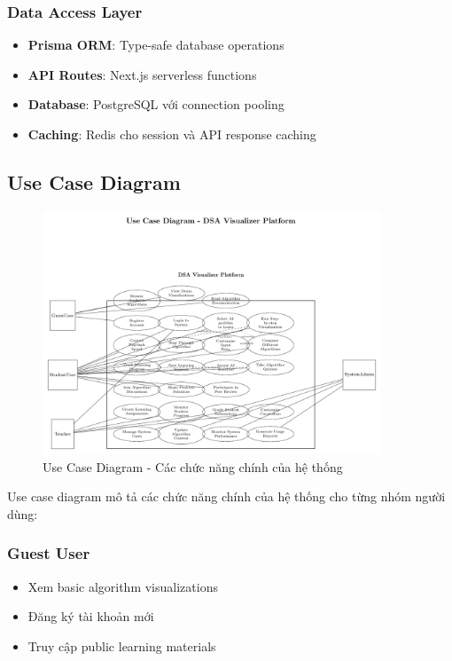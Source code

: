 \documentclass[12pt,a4paper]{article}
\begin{document}
\subsubsection{Data Access Layer}
\begin{itemize}
    \item \textbf{Prisma ORM}: Type-safe database operations
    \item \textbf{API Routes}: Next.js serverless functions
    \item \textbf{Database}: PostgreSQL với connection pooling
    \item \textbf{Caching}: Redis cho session và API response caching
\end{itemize}

\subsection{Use Case Diagram}

\begin{figure}[H]
\centering
\includegraphics[width=0.9\textwidth]{diagrams/usecase_main.pdf}
\caption{Use Case Diagram - Các chức năng chính của hệ thống}
\label{fig:usecase}
\end{figure}

Use case diagram mô tả các chức năng chính của hệ thống cho từng nhóm người dùng:

\subsubsection{Guest User}
\begin{itemize}
    \item Xem basic algorithm visualizations
    \item Đăng ký tài khoản mới
    \item Truy cập public learning materials
\end{itemize}
\end{document}
